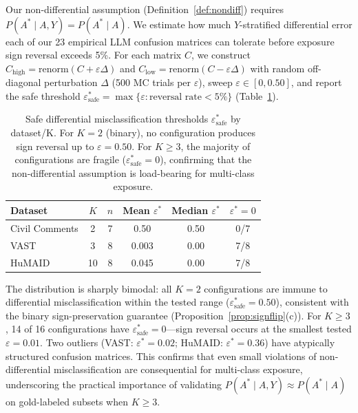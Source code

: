 Our non-differential assumption (Definition~\ref{def:nondiff}) requires $P(A^*{\mid}A,Y) = P(A^*{\mid}A)$. We estimate how much $Y$-stratified differential error each of our 23 empirical LLM confusion matrices can tolerate before exposure sign reversal exceeds 5\%. For each matrix $C$, we construct $C_{\text{high}} = \text{renorm}(C + \varepsilon\Delta)$ and $C_{\text{low}} = \text{renorm}(C - \varepsilon\Delta)$ with random off-diagonal perturbation $\Delta$ (500 MC trials per $\varepsilon$), sweep $\varepsilon \in [0, 0.50]$, and report the safe threshold $\varepsilon^*_{\text{safe}} = \max\{\varepsilon : \text{reversal rate} < 5\%\}$ (Table~\ref{tab:realistic_epsilon}).

\begin{table}[h]
\centering
\small
\caption{Safe differential misclassification thresholds $\varepsilon^*_{\text{safe}}$ by dataset/K. For $K{=}2$ (binary), no configuration produces sign reversal up to $\varepsilon{=}0.50$. For $K{\geq}3$, the majority of configurations are fragile ($\varepsilon^*_{\text{safe}}{=}0$), confirming that the non-differential assumption is load-bearing for multi-class exposure.}
\label{tab:realistic_epsilon}
\begin{tabular}{lccccc}
\toprule
\textbf{Dataset} & $K$ & $n$ & \textbf{Mean} $\varepsilon^*$ & \textbf{Median} $\varepsilon^*$ & $\varepsilon^*{=}0$ \\
\midrule
Civil Comments & 2 & 7 & 0.50 & 0.50 & 0/7 \\
VAST & 3 & 8 & 0.003 & 0.00 & 7/8 \\
HuMAID & 10 & 8 & 0.045 & 0.00 & 7/8 \\
\bottomrule
\end{tabular}
\end{table}

The distribution is sharply bimodal: all $K{=}2$ configurations are immune to differential misclassification within the tested range ($\varepsilon^*_{\text{safe}}{=}0.50$), consistent with the binary sign-preservation guarantee (Proposition~\ref{prop:signflip}(c)). For $K{\geq}3$, 14 of 16 configurations have $\varepsilon^*_{\text{safe}}{=}0$---sign reversal occurs at the smallest tested $\varepsilon{=}0.01$. Two outliers (VAST: $\varepsilon^*{=}0.02$; HuMAID: $\varepsilon^*{=}0.36$) have atypically structured confusion matrices. This confirms that even small violations of non-differential misclassification are consequential for multi-class exposure, underscoring the practical importance of validating $P(A^*{\mid}A,Y) \approx P(A^*{\mid}A)$ on gold-labeled subsets when $K \geq 3$.

